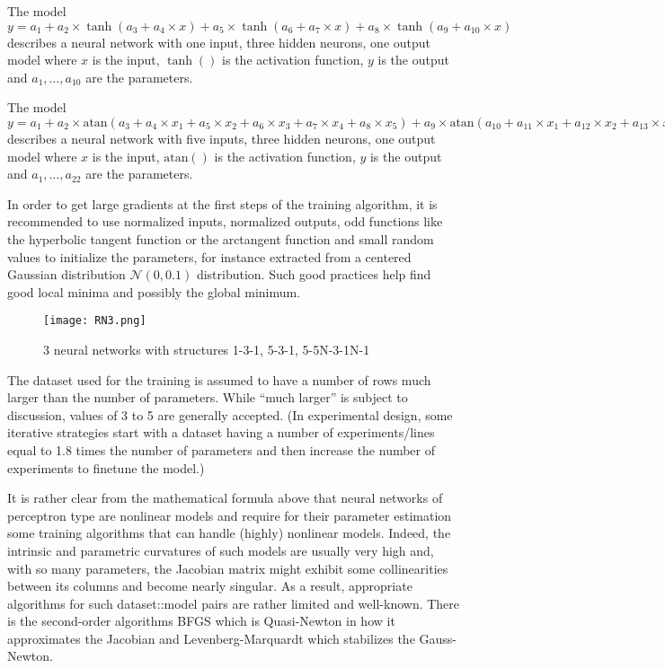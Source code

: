 The model
\(y = a_1 + a_2\times \tanh(a_3 + a_4\times x) + a_5\times \tanh(a_6 + a_7\times x) + a_8\times \tanh(a_9 + a_{10}\times x)\)
describes a neural network with one input, three hidden neurons, one
output model where \(x\) is the input, \(\tanh()\) is the activation
function, \(y\) is the output and \(a_1,\dots,a_{10}\) are the
parameters.

The model
\(y = a_1 + a_2\times \text{atan}(a_3 + a_4\times x_1 + a_5\times x_2 + a_6\times x_3 + a_7\times x_4 + a_8\times x_5) + a_9\times \text{atan}(a_{10} + a_{11}\times x_1 + a_{12}\times x_2 + a_{13}\times x_3 + a_{14}\times x_4 + a_{15}\times x_5) + a_{16}\text{atan}(a_{17} + a_{18}\times x_1 + a_{19}\times x_2 + a_{20}\times x_3 + a_{21}\times x_4 + a_{22}\times x_5)\)
describes a neural network with five inputs, three hidden neurons, one
output model where \(x\) is the input, \(\text{atan}()\) is the
activation function, \(y\) is the output and \(a_1,\dots,a_{22}\) are
the parameters.

In order to get large gradients at the first steps of the training
algorithm, it is recommended to use normalized inputs, normalized
outputs, odd functions like the hyperbolic tangent function or the
arctangent function and small random values to initialize the
parameters, for instance extracted from a centered Gaussian distribution
\(\mathcal N(0, 0.1)\) distribution. Such good practices help find good
local minima and possibly the global minimum.

\begin{figure}
\centering
\texttt{[image: RN3.png]}
\caption{3 neural networks with structures 1-3-1, 5-3-1, 5-5N-3-1N-1}
\end{figure}

The dataset used for the training is assumed to have a number of rows
much larger than the number of parameters. While ``much larger'' is
subject to discussion, values of 3 to 5 are generally accepted. (In
experimental design, some iterative strategies start with a dataset
having a number of experiments/lines equal to 1.8 times the number of
parameters and then increase the number of experiments to finetune the
model.)

It is rather clear from the mathematical formula above that neural
networks of perceptron type are nonlinear models and require for their
parameter estimation some training algorithms that can handle (highly)
nonlinear models. Indeed, the intrinsic and parametric curvatures of
such models are usually very high and, with so many parameters, the
Jacobian matrix might exhibit some collinearities between its columns
and become nearly singular. As a result, appropriate algorithms for such
dataset::model pairs are rather limited and well-known. There is the
second-order algorithms BFGS which is Quasi-Newton in how it
approximates the Jacobian and Levenberg-Marquardt which stabilizes the
Gauss-Newton.

